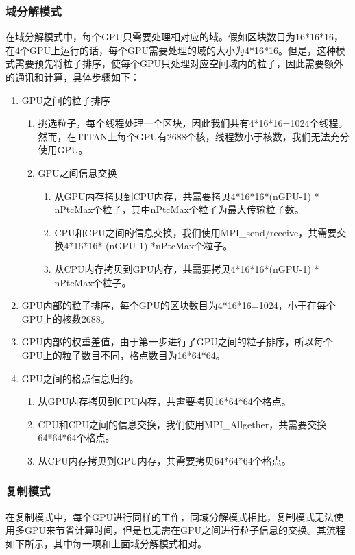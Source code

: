 \subsubsection{域分解模式}
在域分解模式中，每个GPU只需要处理相对应的域。假如区块数目为16*16*16，在4个GPU上运行的话，每个GPU需要处理的域的大小为4*16*16。但是，这种模式需要预先将粒子排序，使每个GPU只处理对应空间域内的粒子，因此需要额外的通讯和计算，具体步骤如下：
\begin{enumerate}
  \item GPU之间的粒子排序
  \begin{enumerate}
    \item 挑选粒子，每个线程处理一个区块，因此我们共有4*16*16=1024个线程。然而，在TITAN上每个GPU有2688个核，线程数小于核数，我们无法充分使用GPU。
    \item GPU之间信息交换
    \begin{enumerate}
      \item 从GPU内存拷贝到CPU内存，共需要拷贝4*16*16*(nGPU-1) * nPtcMax个粒子，其中nPtcMax个粒子为最大传输粒子数。
      \item CPU和CPU之间的信息交换，我们使用MPI\_send/receive，共需要交换4*16*16* (nGPU-1) *nPtcMax个粒子。
      \item 从CPU内存拷贝到GPU内存，共需要拷贝4*16*16*(nGPU-1) * nPtcMax个粒子。
    \end{enumerate}
  \end{enumerate}
  \item GPU内部的粒子排序，每个GPU的区块数目为4*16*16=1024，小于在每个GPU上的核数2688。
  \item GPU内部的权重差值，由于第一步进行了GPU之间的粒子排序，所以每个GPU上的粒子数目不同，格点数目为16*64*64。
  \item GPU之间的格点信息归约。
  \begin{enumerate}
    \item 从GPU内存拷贝到CPU内存，共需要拷贝16*64*64个格点。
    \item CPU和CPU之间的信息交换，我们使用MPI\_Allgether，共需要交换64*64*64个格点。
    \item 从CPU内存拷贝到GPU内存，共需要拷贝64*64*64个格点。
  \end{enumerate}
\end{enumerate}

\subsubsection{复制模式}
在复制模式中，每个GPU进行同样的工作，同域分解模式相比，复制模式无法使用多GPU来节省计算时间，但是也无需在GPU之间进行粒子信息的交换。其流程如下所示，其中每一项和上面域分解模式相对。

